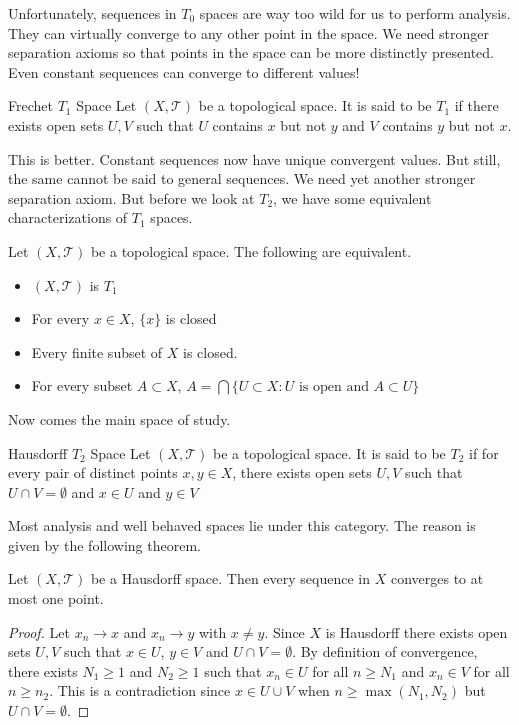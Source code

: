 \documentclass[a4paper]{article}
\begin{document}
Unfortunately, sequences in $T_0$ spaces are way too wild for us to perform analysis. They can virtually converge to any other point in the space. We need stronger separation axioms so that points in the space can be more distinctly presented. Even constant sequences can converge to different values!

\begin{defn}{Frechet $T_1$ Space}{} Let $(X,\mathcal{T})$ be a topological space. It is said to be $T_1$ if there exists open sets $U,V$ such that $U$ contains $x$ but not $y$ and $V$ contains $y$ but not $x$. 
\end{defn}

This is better. Constant sequences now have unique convergent values. But still, the same cannot be said to general sequences. We need yet another stronger separation axiom. But before we look at $T_2$, we have some equivalent characterizations of $T_1$ spaces. 

\begin{prp}{}{} Let $(X,\mathcal{T})$ be a topological space. The following are equivalent. 
\begin{itemize}
\item $(X,\mathcal{T})$ is $T_1$
\item For every $x\in X$, $\{x\}$ is closed
\item Every finite subset of $X$ is closed. 
\item For every subset $A\subset X$, $A=\bigcap\{U\subset X:U\text{ is open and }A\subset U\}$
\end{itemize}
\end{prp}

Now comes the main space of study. 

\begin{defn}{Hausdorff $T_2$ Space}{} Let $(X,\mathcal{T})$ be a topological space. It is said to be $T_2$ if for every pair of distinct points $x,y\in X$, there exists open sets $U,V$ such that $U\cap V=\emptyset$ and $x\in U$ and $y\in V$
\end{defn}

Most analysis and well behaved spaces lie under this category. The reason is given by the following theorem. 

\begin{thm}{}{} Let $(X,\mathcal{T})$ be a Hausdorff space. Then every sequence in $X$ converges to at most one point. 
\begin{proof}
Let $x_n\to x$ and $x_n\to y$ with $x\neq y$. Since $X$ is Hausdorff there exists open sets $U,V$ such that $x\in U$, $y\in V$ and $U\cap V=\emptyset$. By definition of convergence, there exists $N_1\geq 1$ and $N_2\geq 1$ such that $x_n\in U$ for all $n\geq N_1$ and $x_n\in V$ for all $n\geq n_2$. This is a contradiction since $x\in U\cup V$ when $n\geq \max(N_1,N_2)$ but $U\cap V=\emptyset$. 
\end{proof}
\end{thm}
\end{document}
